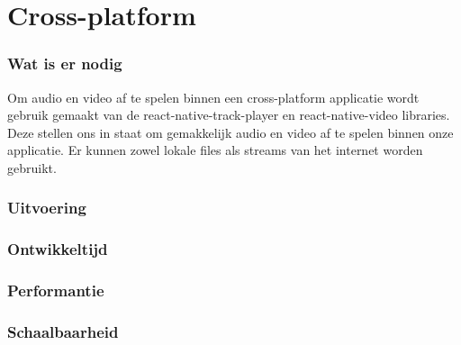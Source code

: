 \section{Cross-platform}
\subsubsection{Wat is er nodig}
Om audio en video af te spelen binnen een cross-platform applicatie wordt gebruik gemaakt van de
react-native-track-player en react-native-video libraries. Deze stellen ons in staat om gemakkelijk 
audio en video af te spelen binnen onze applicatie. Er kunnen zowel lokale files als streams van 
het internet worden gebruikt.

\subsubsection{Uitvoering}



\subsubsection{Ontwikkeltijd}



\subsubsection{Performantie}



\subsubsection{Schaalbaarheid}




